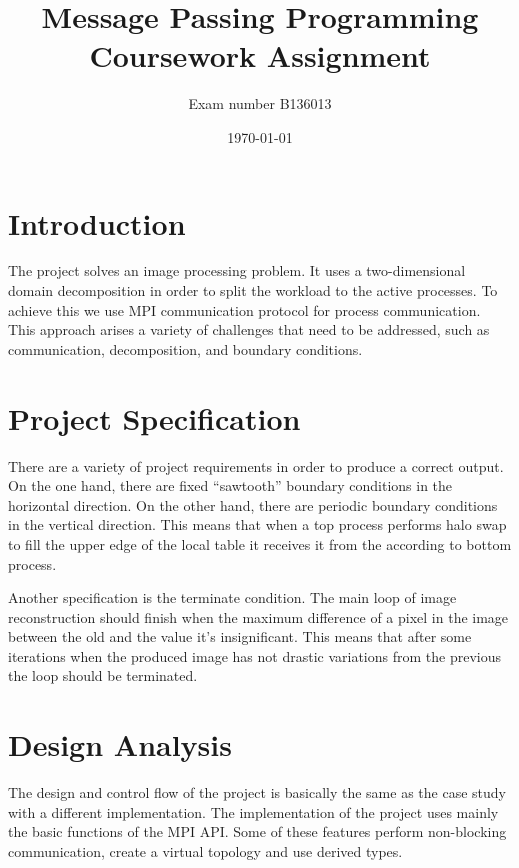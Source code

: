 \documentclass[12pt,a4paper]{article}
\newcommand{\sectionVspacing}{\vspace{15pt}}
\begin{document}
\title{Message Passing Programming Coursework Assignment}
\author{Exam number B136013}
\date{\today}

\makeEPCCtitle

\thispagestyle{empty}

\newpage
\clearpage

\tableofcontents

\newpage
\clearpage

\section{Introduction}
	The project solves an image processing problem. It uses a two-dimensional domain decomposition in order to split the workload to the active processes. To achieve this we use MPI communication protocol for process communication. This approach arises a variety of challenges that need to be addressed, such as communication, decomposition, and boundary conditions.

\sectionVspacing

\section{Project Specification}
    There are a variety of project requirements in order to produce a correct output. On the one hand, there are fixed “sawtooth” boundary conditions in the horizontal direction. On the other hand, there are periodic boundary conditions in the vertical direction. This means that when a top process performs halo swap to fill the upper edge of the local table it receives it from the according to bottom process.

    Another specification is the terminate condition. The main loop of image reconstruction should finish when the maximum difference of a pixel in the image between the old and the value it's insignificant. This means that after some iterations when the produced image has not drastic variations from the previous the loop should be terminated.

\sectionVspacing

\section{Design Analysis}
	The design and control flow of the project is basically the same as the case study with a different implementation. The implementation of the project uses mainly the basic functions of the MPI API. Some of these features perform non-blocking communication, create a virtual topology and use derived types.
\end{document}
